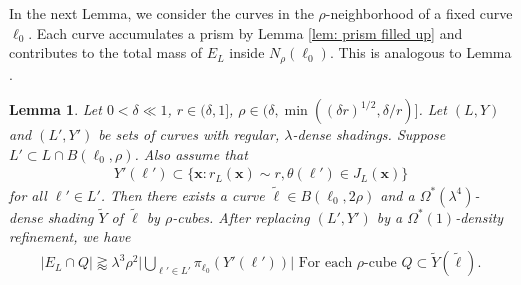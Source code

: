 \documentclass[12pt]{amsart}
\newcommand{\x}{{\bf{x}}}
\numberwithin{equation}{section}
\newtheorem{lemma}{Lemma}[section]
\newcommand{\1}{\mathbbm{1}}
\renewcommand{\x}{\mathbf x}
\begin{document}
In the next Lemma, we consider the curves in the $\rho$-neighborhood of a fixed curve $\ell_0$. Each curve accumulates a prism by Lemma \ref{lem: prism filled up} and contributes to the total mass of $E_L$ inside $N_\rho(\ell_0)$. This is analogous to Lemma \cite[Lemma 2.12]{KWZ}. 

\begin{lemma}\label{lem: add prisms fat tube}
    Let $0 < \delta \ll 1$, $r \in (\delta, 1]$, $\rho \in (\delta, \min((\delta r)^{1/2}, \delta / r)]$. Let $(L,Y)$ and $(L',Y')$ be sets of curves with regular, $\lambda$-dense shadings. Suppose $L' \subset L \cap B(\ell_0, \rho)$. Also assume that 
    \begin{align}
        Y'(\ell') \subset \{\x : r_L(\x) \sim r, \theta(\ell') \in J_L(\x)\}
    \end{align}
    for all $\ell' \in L'$. Then there exists a curve $\tilde \ell \in B(\ell_0, 2\rho)$ and a $\Omega^*(\lambda^4)$-dense shading $\tilde Y$ of $\tilde \ell$ by $\rho$-cubes. After replacing $(L',Y')$ by a $\Omega^*(1)$-density refinement, we have
    \begin{align}\label{eq: add prisms fat tube}
        |E_L \cap Q| \gtrapprox \lambda^3 \rho^2 \Big |\bigcup_{\ell' \in L'} \pi_{\ell_0}(Y'(\ell'))\Big| \text{ For each $\rho$-cube $Q \subset \tilde Y(\tilde \ell)$.}
    \end{align}
\end{lemma}
\end{document}

